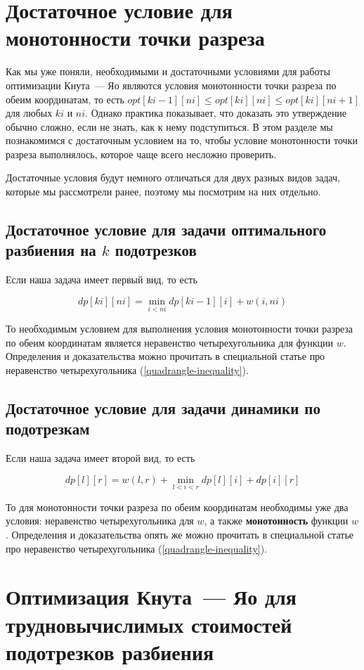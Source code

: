 \section{Достаточное условие для монотонности точки разреза}

Как мы уже поняли, необходимыми и достаточными условиями для работы оптимизации Кнута~--- Яо являются условия монотонности точки разреза по обеим координатам, то есть $opt[ki - 1][ni] \le opt[ki][ni] \le opt[ki][ni + 1]$ для любых $ki$ и $ni$. Однако практика показывает, что доказать это утверждение обычно сложно, если не знать, как к нему подступиться. В этом разделе мы познакомимся с достаточным условием на то, чтобы условие монотонности точки разреза выполнялось, которое чаще всего несложно проверить.

Достаточные условия будут немного отличаться для двух разных видов задач, которые мы рассмотрели ранее, поэтому мы посмотрим на них отдельно.

\subsection{Достаточное условие для задачи оптимального разбиения на $k$ подотрезков}

Если наша задача имеет первый вид, то есть

$$dp[ki][ni] = \min_{i < ni} dp[ki - 1][i] + w(i, ni)$$

То необходимым условием для выполнения условия монотонности точки разреза по обеим координатам является неравенство четырехугольника для функции $w$. Определения и доказательства можно прочитать в специальной статье про неравенство четырехугольника (\ref{quadrangle-inequality}).

\subsection{Достаточное условие для задачи динамики по подотрезкам}

Если наша задача имеет второй вид, то есть

$$dp[l][r] = w(l, r) + \min_{l < i < r} dp[l][i] + dp[i][r]$$

То для монотонности точки разреза по обеим координатам необходимы уже два условия: неравенство четырехугольника для $w$, а также \textbf{монотонность} функции $w$. Определения и доказательства опять же можно прочитать в специальной статье про неравенство четырехугольника (\ref{quadrangle-inequality}).

\section{Оптимизация Кнута~--- Яо для трудновычислимых стоимостей подотрезков разбиения}

